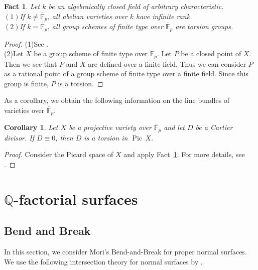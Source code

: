 \documentclass[12pt,twoside]{amsart}
\newcommand{\Pic}[0]{{\operatorname{Pic}}}
\newtheorem{cor}[thm]{Corollary}
\newtheorem{fact}[thm]{Fact}
\theoremstyle{definition}
\newcommand{\Q}{$\mathbb{Q}$}
\newcommand{\fff}{\overline{\mathbb{F}}_p}
\begin{document}
\begin{fact}\label{principle}
Let $k$ be an algebraically closed field of arbitrary characteristic.\\
$(1)$If $k \neq \fff$, all abelian varieties over $k$ have infinite rank.\\
$(2)$If $k=\fff$, all group schemes 
of finite type over $\overline{\mathbb{F}}_p$ are torsion groups. 
\end{fact}

\begin{proof}
(1)See \cite[Theorem 10.1]{FJ}.\\
(2)Let $X$ be a group scheme of finite type 
over $\overline{\mathbb{F}}_p$. 
Let $P$ be a closed point of $X$. 
Then we see that 
$P$ and $X$ are defined over a finite field. 
Thus we can consider $P$ as a rational point of 
a group scheme of finite type over a finite field. 
Since this group is finite, $P$ is a torsion. 
\end{proof}

As a corollary, 
we obtain the following information on the line bundles of 
varieties over $\overline{\mathbb{F}}_p$. 

\begin{cor}\label{pic}
Let $X$ be a projective variety over $\overline{\mathbb{F}}_p$ 
and let $D$ be a Cartier divisor. 
If $D \equiv 0$, then $D$ is a torsion in $\Pic\,X$. 
\end{cor}


\begin{proof}
Consider the Picard space of $X$ and apply Fact~\ref{principle}. 
For more details, see \cite[Lemma~2.16]{Keel}.
\end{proof}




\section{\Q-factorial surfaces}


\subsection{Bend and Break}

In this section, we consider Mori's Bend-and-Break 
for proper normal surfaces. 
We use the following intersection theory for normal surfaces by \cite{Mumford1}. 
\end{document}
